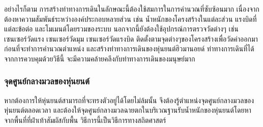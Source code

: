 อย่างไรก็ตาม การสร้างท่าทางการเดินในลักษณะนี้ต้องใช้สมการในการคำนวณที่ซับซ้อนมาก
เนื่องจากต้องหาความสัมพันธ์ระหว่างองค์ประกอบหลายส่วน เช่น น้ำหนักของโครงสร้างในแต่ละส่วน 
แรงบิดที่แต่ละข้อต่อ และโมเมนต์โดยรวมของระบบ นอกจากนี้ยังต้องใช้อุปกรณ์การตรวจวัดต่างๆ เช่น เซนเซอร์วัดแรง
เซนเซอร์วัดมุม เซนเซอร์วัดแรงบิด ติดตั้งตามจุดต่างๆของโครงสร้างเพื่อวัดค่าออกมา ก่อนที่จะทำการคำนวณตำแหน่ง
และสร้างท่าทางการเดินของหุ่นยนต์ฮิวมานอยด์ ท่าทางการเดินที่ได้จากการควบคุมด้วยวิธีนี้ จะมีความคล้ายคลึงกับท่าทางการเดินของมนุษย์มาก

\subsubsection{จุดศูนย์กลางมวลของหุ่นยนต์}
หากต้องการให้หุ่นยนต์สามารถที่จะทรงตัวอยู่ได้โดยไม่ล้มนั้น จึงต้องรู้ตำแหน่งจุดศูนย์กลางมวลของหุ่นยนต์ตลอดเวลา
และต้องให้จุดศูนย์กลางมวลฉายตกในบริเวณฐานรับน้ำหนักของหุ่นยนต์โดยหาจากพื้นที่ที่ฝ่าเท้าสัมผัสกับพื้น
วิธีการนี้เป็นวิธีการทางสถิตศาสตร์